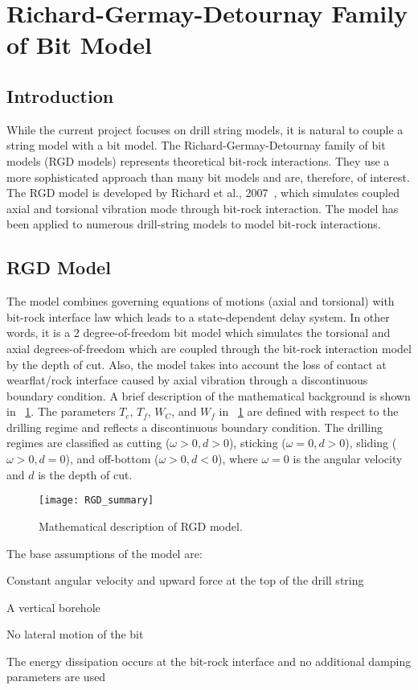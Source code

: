 \section{Richard-Germay-Detournay Family of Bit Model}
\label{ch:rgdmodels}

\subsection{Introduction}
While the current project focuses on drill string models, it is natural to couple a string model with a bit model. The Richard-Germay-Detournay family of bit models (RGD models) represents theoretical bit-rock interactions. They use a more sophisticated approach than many bit models and are, therefore, of interest. The RGD model is developed by Richard et al., 2007\ \cite{ref:richard2007a}, which simulates coupled axial and torsional vibration mode through bit-rock interaction. The model has been applied to numerous drill-string models to model bit-rock interactions.

\subsection{RGD Model}
The model combines governing equations of motions (axial and torsional) with bit-rock interface law which leads to a state-dependent delay system. In other words, it is a 2 degree-of-freedom bit model which simulates the torsional and axial degrees-of-freedom which are coupled through the bit-rock interaction model by the depth of cut. Also, the model takes into account the loss of contact at wearflat/rock interface caused by axial vibration through a discontinuous boundary condition. A brief description of the mathematical background is shown in \figurename~\ref{figure_RGD_Summary}. The parameters $T_c$, $T_f$, $W_C$, and $W_f$ in \figurename~\ref{figure_RGD_Summary} are defined with respect to the drilling regime and reflects a discontinuous boundary condition.  The drilling regimes are classified as cutting ($\omega>0, d>0$), sticking ($\omega=0, d>0$), sliding ($\omega>0, d=0$), and off-bottom ($\omega>0, d<0$), where $\omega=0$ is the angular velocity and $d$ is the depth of cut.
\begin{figure}
  \centering
  \texttt{[image: RGD\_summary]}
  \caption[Mathematical description of RGD model]{Mathematical description of RGD model.}\label{figure_RGD_Summary}
\end{figure}
The base assumptions of the model are:
\begin{bulletedlist}
	\item Constant angular velocity and upward force at the top of the drill string
	\item A vertical borehole
	\item No lateral motion of the bit
	\item The energy dissipation occurs at the bit-rock interface and no additional damping parameters are used
\end{bulletedlist}

